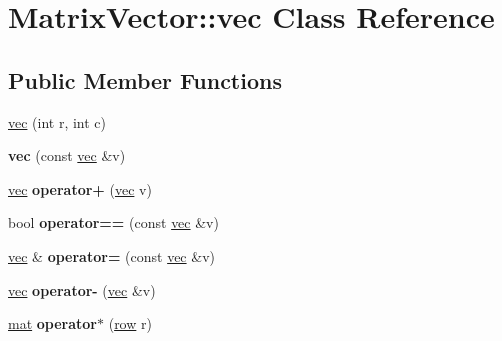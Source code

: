 \hypertarget{class_matrix_vector_1_1vec}{}\section{Matrix\+Vector\+:\+:vec Class Reference}
\label{class_matrix_vector_1_1vec}
\subsection*{Public Member Functions}
\begin{DoxyCompactItemize}
\item 
\mbox{\hyperlink{class_matrix_vector_1_1vec_ab6e2a9eafc93e30f80fa55c6c535d390}{vec}} (int r, int c)
\item 
\mbox{\label{class_matrix_vector_1_1vec_a27d37d91d54816878e65731a1da0b356}} 
{\bfseries vec} (const \mbox{\hyperlink{class_matrix_vector_1_1vec}{vec}} \&v)
\item 
\mbox{\label{class_matrix_vector_1_1vec_a3232c781891c2910d80415afacd6ea98}} 
\mbox{\hyperlink{class_matrix_vector_1_1vec}{vec}} {\bfseries operator+} (\mbox{\hyperlink{class_matrix_vector_1_1vec}{vec}} v)
\item 
\mbox{\label{class_matrix_vector_1_1vec_a9803a34cc3d240ebf094f3769e9fabe9}} 
bool {\bfseries operator==} (const \mbox{\hyperlink{class_matrix_vector_1_1vec}{vec}} \&v)
\item 
\mbox{\label{class_matrix_vector_1_1vec_ac9f996542c421f6c3914895ff01927a5}} 
\mbox{\hyperlink{class_matrix_vector_1_1vec}{vec}} \& {\bfseries operator=} (const \mbox{\hyperlink{class_matrix_vector_1_1vec}{vec}} \&v)
\item 
\mbox{\label{class_matrix_vector_1_1vec_a93520f50fed1ee242f2b2fb295565372}} 
\mbox{\hyperlink{class_matrix_vector_1_1vec}{vec}} {\bfseries operator-\/} (\mbox{\hyperlink{class_matrix_vector_1_1vec}{vec}} \&v)
\item 
\mbox{\label{class_matrix_vector_1_1vec_a48832bec7496fc407aad6130997ff829}} 
\mbox{\hyperlink{class_matrix_vector_1_1mat}{mat}} {\bfseries operator$\ast$} (\mbox{\hyperlink{class_matrix_vector_1_1row}{row}} r)

\end{DoxyCompactItemize}
